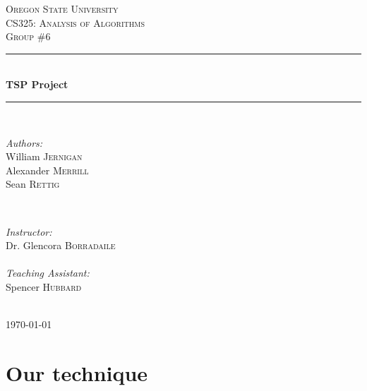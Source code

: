 \documentclass{article}
\begin{document}
\begin{titlepage}

\newcommand{\HRule}{\rule{\linewidth}{0.5mm}} %

\center %
 
\textsc{\LARGE Oregon State University}\\[1.5cm] %
\textsc{\Large CS325: Analysis of Algorithms}\\[0.5cm] %
\textsc{\large Group \#6}\\[0.5cm] %

\HRule \\[0.4cm]
{ \huge \bfseries TSP Project}\\[0.4cm] %
\HRule \\[1.5cm]

\begin{minipage}{0.4\textwidth}
\begin{flushleft} \large
\emph{Authors:}\\
William \textsc{Jernigan}\\
Alexander \textsc{Merrill}\\
Sean \textsc{Rettig}
\end{flushleft}
\end{minipage}
~
\begin{minipage}{0.4\textwidth}
\begin{flushright} \large
\emph{Instructor:} \\
Dr. Glencora \textsc{Borradaile}\\
\emph{\\Teaching Assistant:} \\
Spencer \textsc{Hubbard}
\end{flushright}
\end{minipage}\\[4cm]

{\large \today}\\[3cm] %

\vfill %

\end{titlepage}
\part*{Our technique}
\end{document}
